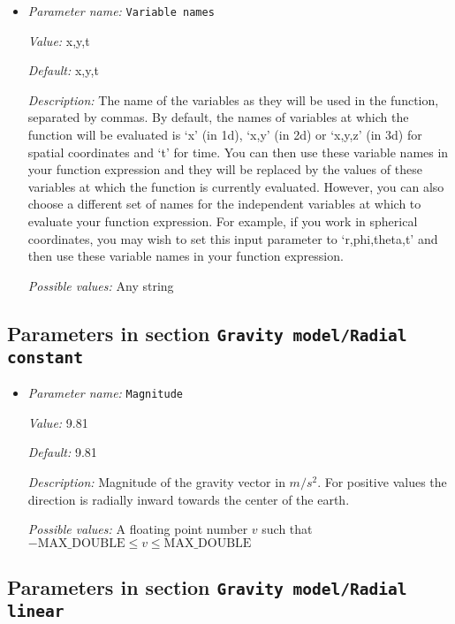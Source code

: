 \begin{itemize}
{\it Possible values:} Any string
\item {\it Parameter name:} {\tt Variable names}
\label{parameters:Gravity model/Function/Variable names}


{\it Value:} x,y,t


{\it Default:} x,y,t


{\it Description:} The name of the variables as they will be used in the function, separated by commas. By default, the names of variables at which the function will be evaluated is `x' (in 1d), `x,y' (in 2d) or `x,y,z' (in 3d) for spatial coordinates and `t' for time. You can then use these variable names in your function expression and they will be replaced by the values of these variables at which the function is currently evaluated. However, you can also choose a different set of names for the independent variables at which to evaluate your function expression. For example, if you work in spherical coordinates, you may wish to set this input parameter to `r,phi,theta,t' and then use these variable names in your function expression.


{\it Possible values:} Any string
\end{itemize}

\subsection{Parameters in section \tt Gravity model/Radial constant}
\label{parameters:Gravity_20model/Radial_20constant}

\begin{itemize}
\item {\it Parameter name:} {\tt Magnitude}
\label{parameters:Gravity model/Radial constant/Magnitude}


{\it Value:} 9.81


{\it Default:} 9.81


{\it Description:} Magnitude of the gravity vector in $m/s^2$. For positive values the direction is radially inward towards the center of the earth.


{\it Possible values:} A floating point number $v$ such that $-\text{MAX\_DOUBLE} \leq v \leq \text{MAX\_DOUBLE}$
\end{itemize}

\subsection{Parameters in section \tt Gravity model/Radial linear}
\label{parameters:Gravity_20model/Radial_20linear}

